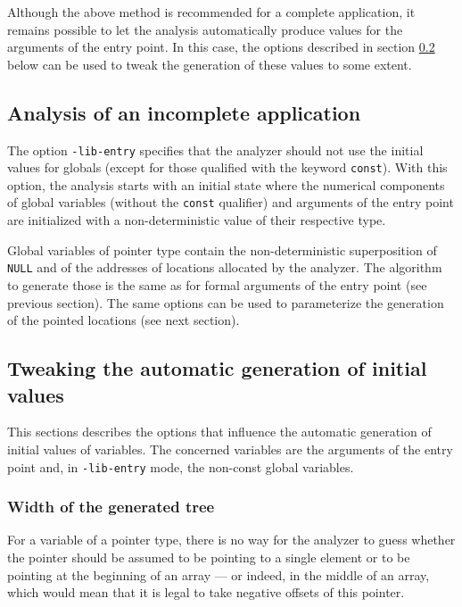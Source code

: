 \documentclass{frama-c-book}
\begin{document}
Although the above method is recommended for a complete
application, it remains possible to let the analysis automatically
produce values for the arguments of the entry point. In this
case, the options described in section \ref{generation_initial} below
can be used to tweak the generation of these values to some extent.

\subsection{Analysis of an incomplete application}\label{libentry}


The option \lstinline|-lib-entry| specifies that the analyzer should not use
the initial values for globals (except for those qualified
with the keyword \lstinline|const|).
With this option, the analysis starts with an initial state
where the numerical components of
global variables (without the \lstinline|const| qualifier) and arguments
of the entry point are initialized with a non-deterministic value of their
respective type.

Global variables of pointer type contain the non-deterministic
superposition of \lstinline|NULL| and of the addresses of
locations allocated by the analyzer. The algorithm to generate
those is the same as for formal arguments of the entry point (see previous
section). The same options can be used to parameterize the generation of
the pointed locations (see next section).

\subsection{Tweaking the automatic generation of initial values}
\label{generation_initial}

This sections describes the options that influence
the automatic generation of initial values
of variables. The concerned
variables are the arguments of the entry point and,
in \lstinline|-lib-entry| mode, the non-const global variables.

\subsubsection{Width of the generated tree}

For a variable of a pointer type, there is no way for the analyzer
to guess whether the pointer should be assumed to be pointing to a single
element or to be pointing at the
beginning of an array --- or indeed, in the middle of an array, which
would mean that it is legal to take negative offsets of this pointer.
\end{document}
